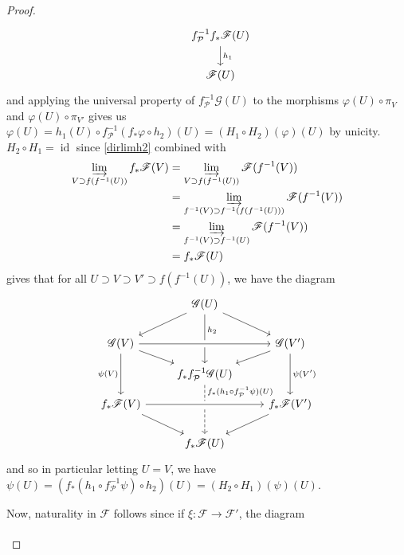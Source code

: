 \documentclass[12pt,letterpaper]{article}
\theoremstyle{definition}
\theoremstyle{remark}
\numberwithin{equation}{section}
\numberwithin{figure}{problem}
\DeclareMathOperator{\id}{id}
\begin{document}
\begin{proof}
\begin{equation*}
\begin{tikzcd}[row sep=small]
      & f_\mathcal{P}^{-1}f_* \mathscr{F}(U) \arrow{dd}{h_1}\\\\
      & \mathscr{F}(U)
    \end{tikzcd}
  \end{equation*}
  and applying the universal property of $f_\mathcal{P}^{-1}\mathscr{G}(U)$ to the morphisms $\varphi(U) \circ \pi_V$ and $\varphi(U) \circ \pi_{V'}$ gives us $\varphi(U) = h_1(U) \circ f_\mathcal{P}^{-1}(f_*\varphi\circ h_2)(U) = (H_1 \circ H_2)(\varphi)(U)$ by unicity. $H_2 \circ H_1 = \id$ since \eqref{dirlimh2} combined with
  \begin{align*}
    \varinjlim_{V \supset f(f^{-1}(U))} f_*\mathscr{F}(V) &= \varinjlim_{V \supset f(f^{-1}(U))} \mathscr{F}(f^{-1}(V))\\
    &= \varinjlim_{f^{-1}(V) \supset f^{-1}(f(f^{-1}(U)))} \mathscr{F}(f^{-1}(V))\\
    &= \varinjlim_{f^{-1}(V) \supset f^{-1}(U)} \mathscr{F}(f^{-1}(V))\\
    &= f_*\mathscr{F}(U)
  \end{align*}
  gives that for all $U \supset V \supset V' \supset f(f^{-1}(U))$, we have the diagram
  \begin{equation*}
    \begin{tikzcd}[row sep=small]
      {} & \mathscr{G}(U)\arrow{ddl}\arrow{ddr}\arrow{ddd}[near start,yshift=-3pt]{h_2}\\
      \\
      \mathscr{G}(V) \arrow{dr}\arrow{dd}[swap]{\psi(V)}\arrow[crossing over]{rr} & & \mathscr{G}(V')\arrow{dl}\arrow{dd}{\psi(V')}\\
      & f_*f_\mathcal{P}^{-1}\mathscr{G}(U)\arrow[dashed]{ddd}[near start,yshift=5pt]{f_*(h_1 \circ f_\mathcal{P}^{-1}\psi)(U)}\\
      f_*\mathscr{F}(V) \arrow[crossing over]{rr}\arrow{ddr} & & f_*\mathscr{F}(V')\arrow{ddl}\\
      \\
      & f_*\mathscr{F}(U)
    \end{tikzcd}
  \end{equation*}
  and so in particular letting $U = V$, we have $\psi(U) = (f_*(h_1 \circ f_\mathcal{P}^{-1}\psi) \circ h_2)(U) = (H_2 \circ H_1)(\psi)(U)$.
  \par Now, naturality in $\mathscr{F}$ follows since if $\xi\colon\mathscr{F} \to \mathscr{F}'$, the diagram
  \begin{equation*}
    \begin{tikzcd}[column sep=16ex]

\end{tikzcd}
\end{equation*}
\end{proof}
\end{document}
